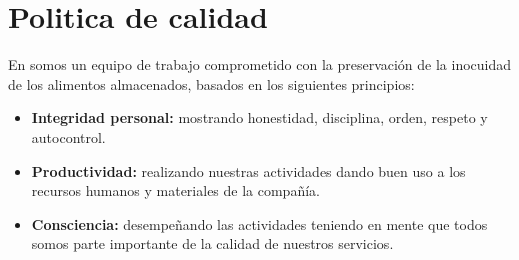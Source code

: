 \thispagestyle{formato-PI}
\renewcommand{\MayorVer}{2}
\renewcommand{\MenorVer}{0}
\renewcommand{\Codigo}{BPD-1-POL}
\renewcommand{\FechaPub}{2023--01}
\renewcommand{\Titulo}{Politica de calidad}


\section{\Titulo}

En  somos un equipo de trabajo comprometido con la preservación de la inocuidad de los alimentos almacenados, basados en los siguientes principios:

\begin{itemize}
	\item \textbf{Integridad personal:} mostrando honestidad, disciplina, orden, respeto y autocontrol.
	\item \textbf{Productividad:} realizando nuestras actividades dando buen uso a los recursos humanos y materiales de la compañía.
	\item \textbf{Consciencia:} desempeñando las actividades teniendo en mente que todos somos parte importante de la calidad de nuestros servicios.
\end{itemize}